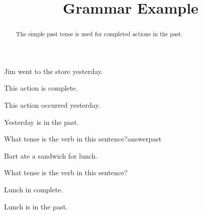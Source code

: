 \documentclass{ximera}
\title{Grammar Example}
\begin{document}
\begin{abstract}
The simple past tense is used for completed actions in the past.
\end{abstract}
\maketitle

\begin{question}
Jim went to the store yesterday.

\begin{solution}
\begin{hint}
This action is complete.
\end{hint}
\begin{hint}
This action occurred yesterday.
\end{hint}
\begin{hint}
Yesterday is in the past.
\end{hint}
What tense is the verb in this sentence?answer{past}
\end{solution}
\end{question}

\begin{question}
Bart ate a sandwich for lunch.
\begin{solution}
What tense is the verb in this sentence?
\begin{multiple-choice}
\end{multiple-choice}
\begin{hint}
Lunch in complete.
\end{hint}
\begin{hint}
Lunch is in the past.
\end{hint}
\end{solution}
\end{question}
\end{document}
